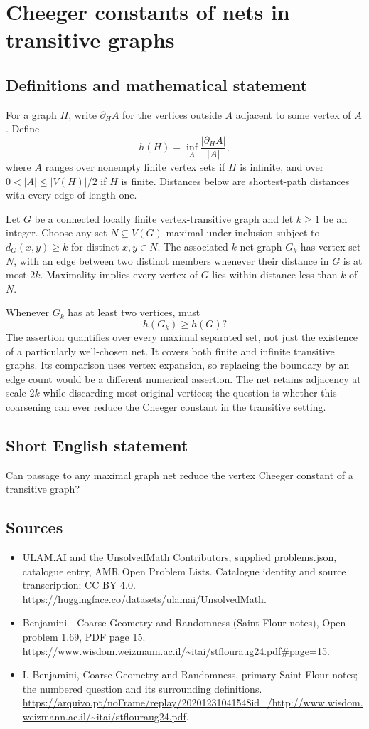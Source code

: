 \documentclass[11pt,a4paper]{article}
\begin{document}
\section*{Cheeger constants of nets in transitive graphs}\label{statement}

\subsection{Definitions and mathematical statement}
For a graph $H$, write $\partial_H A$ for the vertices outside $A$ adjacent to some vertex of $A$. Define
\[
h(H)=\inf_A\frac{|\partial_H A|}{|A|},
\]
where $A$ ranges over nonempty finite vertex sets if $H$ is infinite, and over $0<|A|\le |V(H)|/2$ if $H$ is finite. Distances below are shortest-path distances with every edge of length one.

Let $G$ be a connected locally finite vertex-transitive graph and let $k\ge1$ be an integer. Choose any set $N\subseteq V(G)$ maximal under inclusion subject to $d_G(x,y)\ge k$ for distinct $x,y\in N$. The associated $k$-net graph $G_k$ has vertex set $N$, with an edge between two distinct members whenever their distance in $G$ is at most $2k$. Maximality implies every vertex of $G$ lies within distance less than $k$ of $N$.

Whenever $G_k$ has at least two vertices, must
\[
h(G_k)\ge h(G)?
\]
The assertion quantifies over every maximal separated set, not just the existence of a particularly well-chosen net. It covers both finite and infinite transitive graphs. Its comparison uses vertex expansion, so replacing the boundary by an edge count would be a different numerical assertion. The net retains adjacency at scale $2k$ while discarding most original vertices; the question is whether this coarsening can ever reduce the Cheeger constant in the transitive setting.
\subsection{Short English statement}
Can passage to any maximal graph net reduce the vertex Cheeger constant of a transitive graph?
\subsection{Sources}
\begin{itemize}
\item[S1] ULAM.AI and the UnsolvedMath Contributors, supplied problems.json, catalogue entry, AMR Open Problem Lists. Catalogue identity and source transcription; CC BY 4.0.
\url{https://huggingface.co/datasets/ulamai/UnsolvedMath}.
\item[S2] Benjamini - Coarse Geometry and Randomness (Saint-Flour notes), Open problem 1.69, PDF page 15. 
\url{https://www.wisdom.weizmann.ac.il/~itai/stflouraug24.pdf#page=15}.
\item[S3] I. Benjamini, Coarse Geometry and Randomness, primary Saint-Flour notes; the numbered question and its surrounding definitions.
\url{https://arquivo.pt/noFrame/replay/20201231041548id_/http://www.wisdom.weizmann.ac.il/~itai/stflouraug24.pdf}.
\end{itemize}
\end{document}
